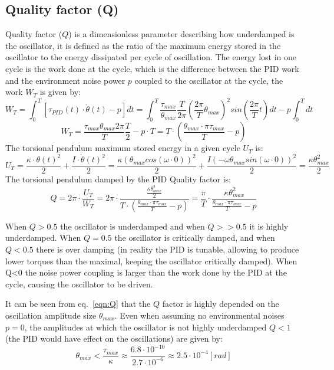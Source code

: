\documentclass[\main/master.tex]{subfiles}
\begin{document}
\subsection{Quality factor (Q)}
Quality factor ($Q$) is a dimensionless parameter describing how underdamped is the oscillator, it is defined as the ratio of the maximum energy stored in the oscillator to the energy dissipated per cycle of oscillation.
The energy lost in one cycle is the work done at the cycle, which is the difference between the PID work and the environment noise power $p$ coupled to the oscillator at the cycle, the work $W_T$ is given by:
\begin{equation}
W_T = \int_0^T[\tau_{PID}(t)\cdot\dot{\theta}(t) - p]dt = \int_0^T\frac{\tau_{max} }{\theta_{max}} \frac{ T}{2\pi}(\frac{2\pi}{T}\theta_{max})^2 sin(\frac{2\pi}{T}t)dt-p\int_0^T dt 
\label{eqn:pid work 1}
\end{equation}
\begin{equation}
W_T = \frac{\tau_{max}\theta_{max}2\pi}{T} \frac{T}{2}-p\cdot T = T\cdot(\frac{\theta_{max}\cdot\pi\tau_{max}}{T} -p)
\label{eqn:pid work}
\end{equation}
The torsional pendulum maximum stored energy in a given cycle $U_T$ is:
\begin{equation}
U_T = \frac{\kappa\cdot\theta(t)^2}{2}+\frac{I\cdot\dot{\theta}(t)^2}{2} =\frac{\kappa(\theta_{max}cos(\omega\cdot 0))^2}{2}+\frac{I(-\omega\theta_{max}sin(\omega\cdot 0))^2}{2} = \frac{\kappa\theta_{max}^2}{2}
\label{eqn:pendulum energy}
\end{equation}
The torsional pendulum damped by the PID Quality factor is:
\begin{equation}
Q = 2\pi\cdot \frac{U_T}{W_T}= 2\pi\cdot\frac{\frac{\kappa\theta_{max}^2}{2}}{T\cdot(\frac{\theta_{max}\cdot\pi\tau_{max}}{T} -p)} =
\frac{\pi}{T}\cdot\frac{\kappa\theta_{max}^2}{\frac{\theta_{max}\cdot\pi\tau_{max}}{T} -p}
\label{eqn:Q}
\end{equation} 

When $Q>0.5$ the oscillator is underdamped and when $Q>>0.5$ it is highly underdamped. When $Q = 0.5$ the oscillator is critically damped, and when $Q < 0.5$ there is over damping (in reality the PID is tunable, allowing to produce lower torques than the maximal, keeping the oscillator critically damped). When Q<0 the noise power coupling is larger than the work done by the PID at the cycle, causing the oscillator to be driven. 
\par\noindent
It can be seen from eq.~\ref{eqn:Q} that the $Q$ factor is highly depended on the oscillation amplitude size $\theta_{max}$. Even when assuming no environmental noises $p=0$, the amplitudes at which the oscillator is not highly underdamped $Q < 1$ (the PID would have effect on the oscillations) are given by:  
\begin{equation}
\theta_{max} < \frac{\tau_{max}}{\kappa} \approx \frac{6.8\cdot 10^{-10}}{2.7\cdot 10^{-6}} \approx 2.5\cdot 10^{-4} [rad]
\label{eqn:low Q}
\end{equation}
\end{document}
